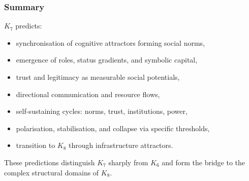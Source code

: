 \subsubsection{Summary}

$K_7$ predicts:
\begin{itemize}
    \item synchronisation of cognitive attractors forming social norms,
    \item emergence of roles, status gradients, and symbolic capital,
    \item trust and legitimacy as measurable social potentials,
    \item directional communication and resource flows,
    \item self-sustaining cycles: norms, trust, institutions, power,
    \item polarisation, stabilisation, and collapse via specific thresholds,
    \item transition to $K_8$ through infrastructure attractors.
\end{itemize}

These predictions distinguish $K_7$ sharply from $K_6$ and form the bridge
to the complex structural domains of $K_8$.
